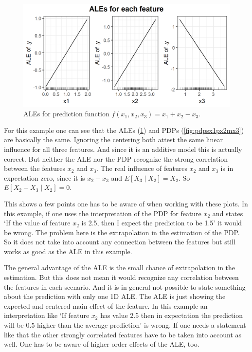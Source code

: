 \documentclass[]{krantz}
\begin{document}
\begin{figure}
\includegraphics[width=1\linewidth]{images/ale_1_ALEs_x1_plus_x2_minus_x3_150_0_2_0p5} \caption{ALEs for prediction function
\(f(x_1, x_2, x_3) = x_1 + x_2 - x_3\).}\label{fig:alesx1px2mx3}
\end{figure}




For this example one can see that the ALEs (\ref{fig:alesx1px2mx3}) and
PDPs (\ref{fig:pdpsx1px2mx3}) are basically the same. Ignoring the
centering both attest the same linear influence for all three features.
And since it is an additive model this is actually correct. But neither
the ALE nor the PDP recognize the strong correlation between the
features \(x_2\) and \(x_3\). The real influence of features \(x_2\) and
\(x_3\) is in expectation zero, since it is \(x_2 - x_3\) and
\(E[X_3 \mid X_2] = X_2\). So \(E[X_2 - X_3 \mid X_2] = 0\).

This shows a few points one has to be aware of when working with these
plots. In this example, if one uses the interpretation of the PDP for
feature \(x_2\) and states `If the value of feature \(x_2\) is 2.5, then
I expect the prediction to be 1.5' it would be wrong. The problem here
is the extrapolation in the estimation of the PDP. So it does not take
into account any connection between the features but still works as good
as the ALE in this example.

The general advantage of the ALE is the small chance of extrapolation in
the estimation. But this does not mean it would recognize any
correlation between the features in each scenario. And it is in general
not possible to state something about the prediction with only one 1D
ALE. The ALE is just showing the expected and centered main effect of
the feature. In this example an interpretation like `If feature \(x_2\)
has value 2.5 then in expectation the prediction will be 0.5 higher than
the average prediction' is wrong. If one needs a statement like that the
other strongly correlated features have to be taken into account as
well. One has to be aware of higher order effects of the ALE, too.
\end{document}
